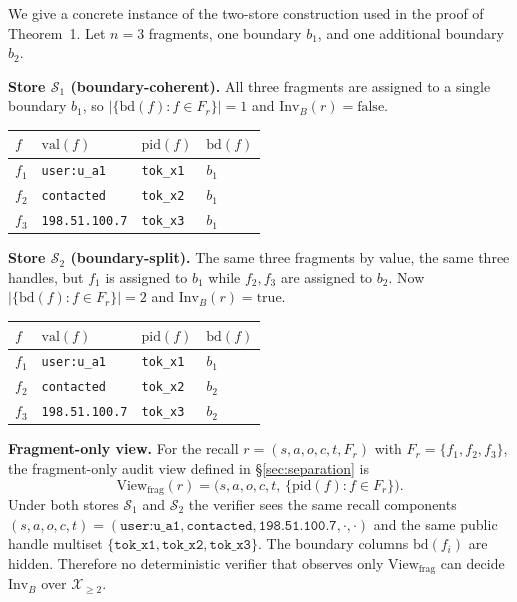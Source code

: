 \documentclass[conference,compsoc]{IEEEtran}
\begin{document}
We give a concrete instance of the two-store construction used in the proof of Theorem~1. Let $n=3$ fragments, one boundary $b_1$, and one additional boundary $b_2$.

\textbf{Store $\mathcal{S}_1$ (boundary-coherent).} All three fragments are assigned to a single boundary $b_1$, so $|\{\mathrm{bd}(f) : f \in F_r\}| = 1$ and $\mathrm{Inv}_B(r) = \mathrm{false}$.

\begin{center}
\footnotesize
\begin{tabular}{llll}
\toprule
$f$ & $\mathrm{val}(f)$ & $\mathrm{pid}(f)$ & $\mathrm{bd}(f)$ \\
\midrule
$f_1$ & \texttt{user:u\_a1} & \texttt{tok\_x1} & $b_1$ \\
$f_2$ & \texttt{contacted}   & \texttt{tok\_x2} & $b_1$ \\
$f_3$ & \texttt{198.51.100.7} & \texttt{tok\_x3} & $b_1$ \\
\bottomrule
\end{tabular}
\end{center}

\textbf{Store $\mathcal{S}_2$ (boundary-split).} The same three fragments by value, the same three handles, but $f_1$ is assigned to $b_1$ while $f_2, f_3$ are assigned to $b_2$. Now $|\{\mathrm{bd}(f) : f \in F_r\}| = 2$ and $\mathrm{Inv}_B(r) = \mathrm{true}$.

\begin{center}
\footnotesize
\begin{tabular}{llll}
\toprule
$f$ & $\mathrm{val}(f)$ & $\mathrm{pid}(f)$ & $\mathrm{bd}(f)$ \\
\midrule
$f_1$ & \texttt{user:u\_a1}    & \texttt{tok\_x1} & $b_1$ \\
$f_2$ & \texttt{contacted}      & \texttt{tok\_x2} & $b_2$ \\
$f_3$ & \texttt{198.51.100.7}   & \texttt{tok\_x3} & $b_2$ \\
\bottomrule
\end{tabular}
\end{center}

\textbf{Fragment-only view.} For the recall $r = (s, a, o, c, t, F_r)$ with $F_r = \{f_1, f_2, f_3\}$, the fragment-only audit view defined in \S\ref{sec:separation} is
\[
\mathrm{View}_{\mathrm{frag}}(r) = \bigl(s, a, o, c, t,\, \{\mathrm{pid}(f) : f \in F_r\}\bigr).
\]
Under both stores $\mathcal{S}_1$ and $\mathcal{S}_2$ the verifier sees the same recall components $(s, a, o, c, t) = (\texttt{user:u\_a1}, \texttt{contacted}, \texttt{198.51.100.7}, \cdot, \cdot)$ and the same public handle multiset $\{\texttt{tok\_x1}, \texttt{tok\_x2}, \texttt{tok\_x3}\}$. The boundary columns $\mathrm{bd}(f_i)$ are hidden. Therefore no deterministic verifier that observes only $\mathrm{View}_{\mathrm{frag}}$ can decide $\mathrm{Inv}_B$ over $\mathcal{X}_{\geq 2}$.
\end{document}
